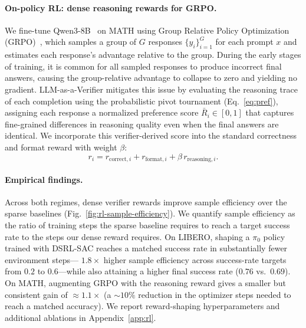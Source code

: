 \paragraph{On-policy RL: dense reasoning rewards for GRPO.} We fine-tune Qwen3-8B~\citep{yang2025qwen3} on MATH using Group Relative Policy Optimization (GRPO)~\citep{deepseek-ai_deepseek-r1_2025}, which samples a group of $G$ responses $\{y_i\}_{i=1}^{G}$ for each prompt $x$ and estimates each response's advantage relative to the group. During the early stages of training, it is common for all sampled responses to produce incorrect final answers, causing the group-relative advantage to collapse to zero and yielding no gradient. LLM-as-a-Verifier mitigates this issue by evaluating the reasoning trace of each completion using the probabilistic pivot tournament (Eq.~\ref{eq:pref}), assigning each response a normalized preference score $\bar{R}_i \in [0,1]$ that captures fine-grained differences in reasoning quality even when the final answers are identical. We incorporate this verifier-derived score into the standard correctness and format reward with weight $\beta$:
\begin{equation}
r_i
=
r_{\mathrm{correct},i}
+
r_{\mathrm{format},i}
+
\beta\, r_{\mathrm{reasoning},i}.
\label{eq:rl-grpo}
\end{equation}


\paragraph{Empirical findings.} Across both regimes, dense verifier rewards improve sample efficiency over the sparse baselines
(Fig.~\ref{fig:rl-sample-efficiency}). We quantify sample efficiency as the ratio of training steps the sparse baseline requires to reach a target success rate to the steps our dense reward requires. On LIBERO, shaping a $\pi_0$ policy trained with DSRL-SAC reaches a matched success rate in substantially fewer environment steps--- $\mathbf{1.8\times}$ higher sample efficiency across success-rate targets from $0.2$ to $0.6$---while also attaining a higher final success rate ($0.76$ vs.\ $0.69$). On MATH, augmenting GRPO with the reasoning reward gives a smaller but consistent gain of $\approx\mathbf{1.1\times}$ (a $\sim\!10\%$ reduction in the optimizer steps needed to reach a matched accuracy). We report reward-shaping hyperparameters and additional ablations in Appendix~\ref{app:rl}.